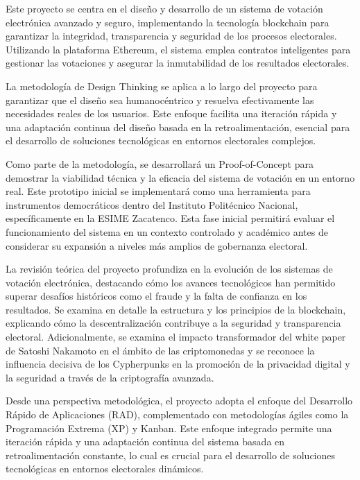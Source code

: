 \documentclass{report}
\begin{document}
	Este proyecto se centra en el diseño y desarrollo de un sistema de votación electrónica avanzado y seguro, implementando la tecnología blockchain para garantizar la integridad, transparencia y seguridad de los procesos electorales. Utilizando la plataforma Ethereum, el sistema emplea contratos inteligentes para gestionar las votaciones y asegurar la inmutabilidad de los resultados electorales.
	
	La metodología de Design Thinking se aplica a lo largo del proyecto para garantizar que el diseño sea humanocéntrico y resuelva efectivamente las necesidades reales de los usuarios. Este enfoque facilita una iteración rápida y una adaptación continua del diseño basada en la retroalimentación, esencial para el desarrollo de soluciones tecnológicas en entornos electorales complejos.
	
	Como parte de la metodología, se desarrollará un Proof-of-Concept para demostrar la viabilidad técnica y la eficacia del sistema de votación en un entorno real. Este prototipo inicial se implementará como una herramienta para instrumentos democráticos dentro del Instituto Politécnico Nacional, específicamente en la ESIME Zacatenco. Esta fase inicial permitirá evaluar el funcionamiento del sistema en un contexto controlado y académico antes de considerar su expansión a niveles más amplios de gobernanza electoral.
	
	La revisión teórica del proyecto profundiza en la evolución de los sistemas de votación electrónica, destacando cómo los avances tecnológicos han permitido superar desafíos históricos como el fraude y la falta de confianza en los resultados. Se examina en detalle la estructura y los principios de la blockchain, explicando cómo la descentralización contribuye a la seguridad y transparencia electoral. Adicionalmente, se examina el impacto transformador del white paper de Satoshi Nakamoto en el ámbito de las criptomonedas y se reconoce la influencia decisiva de los Cypherpunks en la promoción de la privacidad digital y la seguridad a través de la criptografía avanzada.
	
	Desde una perspectiva metodológica, el proyecto adopta el enfoque del Desarrollo Rápido de Aplicaciones (RAD), complementado con metodologías ágiles como la Programación Extrema (XP) y Kanban. Este enfoque integrado permite una iteración rápida y una adaptación continua del sistema basada en retroalimentación constante, lo cual es crucial para el desarrollo de soluciones tecnológicas en entornos electorales dinámicos.
	
\end{document}
